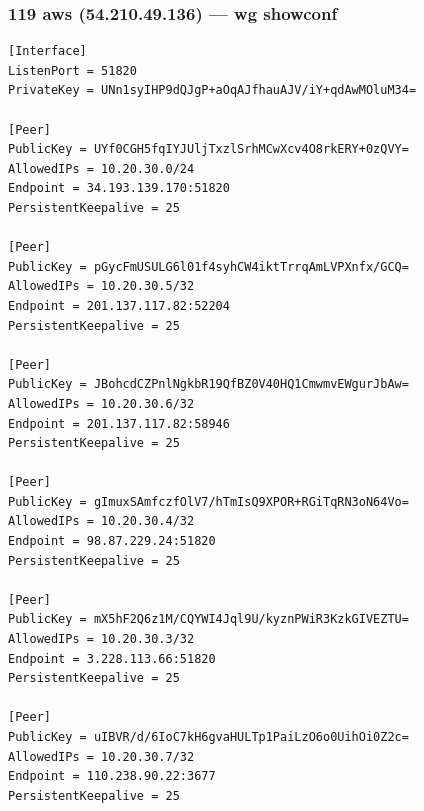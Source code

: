 \documentclass[11pt,a4paper]{article}
\begin{document}
\subsubsection*{119 aws (54.210.49.136) — wg showconf}
\begin{lstlisting}
[Interface]
ListenPort = 51820
PrivateKey = UNn1syIHP9dQJgP+aOqAJfhauAJV/iY+qdAwMOluM34=

[Peer]
PublicKey = UYf0CGH5fqIYJUljTxzlSrhMCwXcv4O8rkERY+0zQVY=
AllowedIPs = 10.20.30.0/24
Endpoint = 34.193.139.170:51820
PersistentKeepalive = 25

[Peer]
PublicKey = pGycFmUSULG6l01f4syhCW4iktTrrqAmLVPXnfx/GCQ=
AllowedIPs = 10.20.30.5/32
Endpoint = 201.137.117.82:52204
PersistentKeepalive = 25

[Peer]
PublicKey = JBohcdCZPnlNgkbR19QfBZ0V40HQ1CmwmvEWgurJbAw=
AllowedIPs = 10.20.30.6/32
Endpoint = 201.137.117.82:58946
PersistentKeepalive = 25

[Peer]
PublicKey = gImuxSAmfczfOlV7/hTmIsQ9XPOR+RGiTqRN3oN64Vo=
AllowedIPs = 10.20.30.4/32
Endpoint = 98.87.229.24:51820
PersistentKeepalive = 25

[Peer]
PublicKey = mX5hF2Q6z1M/CQYWI4Jql9U/kyznPWiR3KzkGIVEZTU=
AllowedIPs = 10.20.30.3/32
Endpoint = 3.228.113.66:51820
PersistentKeepalive = 25

[Peer]
PublicKey = uIBVR/d/6IoC7kH6gvaHULTp1PaiLzO6o0UihOi0Z2c=
AllowedIPs = 10.20.30.7/32
Endpoint = 110.238.90.22:3677
PersistentKeepalive = 25

\end{lstlisting}
\end{document}
